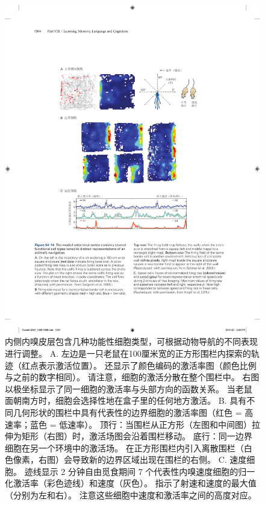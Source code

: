 \begin{figure}[htbp]
	\centering
	\includegraphics[width=0.93\linewidth]{chap54/fig_54_14}
	\caption{内侧内嗅皮层包含几种功能性细胞类型，可根据动物导航的不同表现进行调整。
		A. 左边是一只老鼠在100厘米宽的正方形围栏内探索的轨迹（红点表示激活位置）。
		还显示了颜色编码的激活率图（颜色比例与之前的数字相同）。
		请注意，细胞的激活分散在整个围栏中。
		右图以极坐标显示了同一细胞的激活率与头部方向的函数关系。
		当老鼠面朝南方时，细胞会选择性地在盒子里的任何地方激活\cite{sargolini2006conjunctive}。
		B. 具有不同几何形状的围栏中具有代表性的边界细胞的激活率图（红色 = 高速率；蓝色 = 低速率）。
		顶行：当围栏从正方形（左图和中间图）拉伸为矩形（右图）时，激活场图会沿着围栏移动。
		底行：同一边界细胞在另一个环境中的激活场。
		在正方形围栏内引入离散围栏（白色像素，右图）会导致新的边界区域出现在围栏的右侧\cite{solstad2008representation}。
		C. 速度细胞。
		迹线显示 2 分钟自由觅食期间 7 个代表性内嗅速度细胞的归一化激活率（彩色迹线）和速度（灰色）。
		指示了射速和速度的最大值（分别为左和右）。
		注意这些细胞中速度和激活率之间的高度对应\cite{kropff2015speed}。}
	\label{fig:54_14}
\end{figure}


